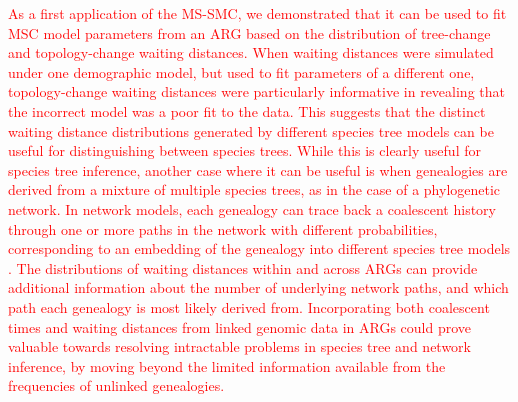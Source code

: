 \documentclass[11pt]{article}
\begin{document}
\textcolor{red}{
As a first application of the MS-SMC, we demonstrated that it
can be used to fit MSC model parameters from an ARG based on the 
distribution of tree-change and topology-change waiting distances.
When waiting distances were simulated under one demographic model, 
but used to fit parameters of a different one, 
topology-change waiting distances were particularly informative in
revealing that the incorrect model was a poor fit to the data.
% 
This suggests that the distinct waiting distance distributions 
generated by different species tree models can be useful for
distinguishing between species trees.
% 
While this is clearly useful for species tree inference, another
case where it can be useful is when genealogies are derived from a
mixture of multiple species trees, as in the case of a 
phylogenetic network. In network models, each genealogy can trace
back a coalescent history through one or more paths in the network 
with different probabilities, corresponding to an embedding of the
genealogy into different species tree models
\citep{wen_bayesian_2016, degnan2018modeling}. %
The distributions of waiting distances within and across ARGs can provide
additional information about the number of underlying network paths, and
which path each genealogy is most likely derived from.
Incorporating both coalescent times and waiting distances from linked
genomic data in ARGs could prove valuable towards resolving intractable
problems in species tree and network inference, by moving beyond the 
limited information available from the frequencies of unlinked genealogies.
}
\end{document}
